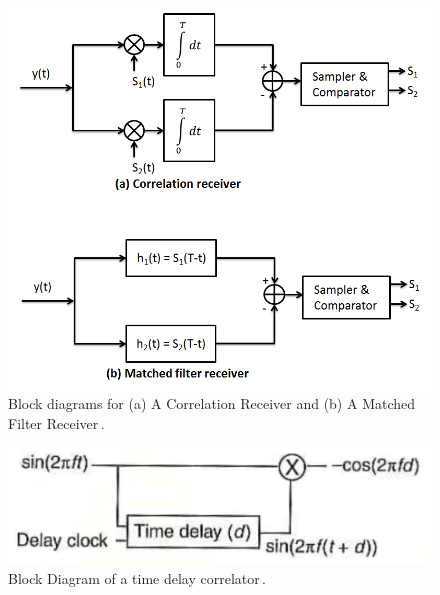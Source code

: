 \begin{figure}
  \centering
	\includegraphics[width=0.75\linewidth]{images/MyBlockDiagrams.png} 
	\caption{Block diagrams for (a) A Correlation Receiver and (b) A Matched Filter Receiver\,\cite{J.Das1986}.}
   \label{BlockDiagrams}
\end{figure}

\begin{figure}
  \centering
	\includegraphics[width=0.75\linewidth]{images/TimeDelayCorrelator.png} 
	\caption{Block Diagram of a time delay correlator\,\cite{Seguine2006}.}
   \label{TimeDelayCorrelator}
\end{figure}

